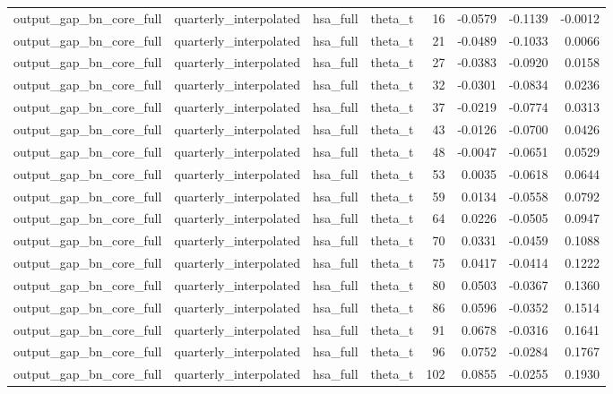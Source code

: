 \begin{tabular}{llllrrrr}
output\_gap\_bn\_core\_full & quarterly\_interpolated & hsa\_full & theta\_t & 16 & -0.0579 & -0.1139 & -0.0012 \\
output\_gap\_bn\_core\_full & quarterly\_interpolated & hsa\_full & theta\_t & 21 & -0.0489 & -0.1033 & 0.0066 \\
output\_gap\_bn\_core\_full & quarterly\_interpolated & hsa\_full & theta\_t & 27 & -0.0383 & -0.0920 & 0.0158 \\
output\_gap\_bn\_core\_full & quarterly\_interpolated & hsa\_full & theta\_t & 32 & -0.0301 & -0.0834 & 0.0236 \\
output\_gap\_bn\_core\_full & quarterly\_interpolated & hsa\_full & theta\_t & 37 & -0.0219 & -0.0774 & 0.0313 \\
output\_gap\_bn\_core\_full & quarterly\_interpolated & hsa\_full & theta\_t & 43 & -0.0126 & -0.0700 & 0.0426 \\
output\_gap\_bn\_core\_full & quarterly\_interpolated & hsa\_full & theta\_t & 48 & -0.0047 & -0.0651 & 0.0529 \\
output\_gap\_bn\_core\_full & quarterly\_interpolated & hsa\_full & theta\_t & 53 & 0.0035 & -0.0618 & 0.0644 \\
output\_gap\_bn\_core\_full & quarterly\_interpolated & hsa\_full & theta\_t & 59 & 0.0134 & -0.0558 & 0.0792 \\
output\_gap\_bn\_core\_full & quarterly\_interpolated & hsa\_full & theta\_t & 64 & 0.0226 & -0.0505 & 0.0947 \\
output\_gap\_bn\_core\_full & quarterly\_interpolated & hsa\_full & theta\_t & 70 & 0.0331 & -0.0459 & 0.1088 \\
output\_gap\_bn\_core\_full & quarterly\_interpolated & hsa\_full & theta\_t & 75 & 0.0417 & -0.0414 & 0.1222 \\
output\_gap\_bn\_core\_full & quarterly\_interpolated & hsa\_full & theta\_t & 80 & 0.0503 & -0.0367 & 0.1360 \\
output\_gap\_bn\_core\_full & quarterly\_interpolated & hsa\_full & theta\_t & 86 & 0.0596 & -0.0352 & 0.1514 \\
output\_gap\_bn\_core\_full & quarterly\_interpolated & hsa\_full & theta\_t & 91 & 0.0678 & -0.0316 & 0.1641 \\
output\_gap\_bn\_core\_full & quarterly\_interpolated & hsa\_full & theta\_t & 96 & 0.0752 & -0.0284 & 0.1767 \\
output\_gap\_bn\_core\_full & quarterly\_interpolated & hsa\_full & theta\_t & 102 & 0.0855 & -0.0255 & 0.1930 \\

\end{tabular}
